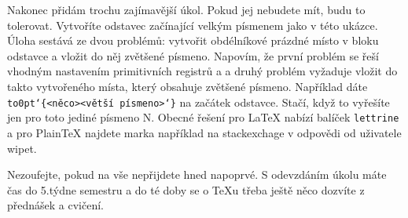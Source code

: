 \Capinsert Nakonec přidám trochu zajímavější úkol. Pokud jej nebudete mít, budu to tolerovat. Vy\-tvoříte odstavec začínající velkým písmenem jako v této ukázce. Úloha sestává ze dvou
problémů: vytvořit obdélníkové prázdné místo v bloku odstavce a vložit do něj zvět\-šené písmeno. Napovím, že první problém se řeší vhodným nastavením primitivních registrů
 a  a druhý problém vyžaduje vložit  do takto vytvořeného místa, který obsahuje zvětšené písmeno. Například dáte
\medskip
{\tt {} to0pt{\tt\char`\{}<něco><větší písmeno>{\tt\char`\}}}
\medskip
\noindent na začátek odstavce. Stačí, když to vyřešíte jen pro toto jediné písmeno N. Obecné řešení pro \LaTeX{}
nabízí balíček {\tt lettrine} a pro Plain\TeX{} najdete marka například na stackexchage v odpovědi od uživatele wipet.

Nezoufejte, pokud na vše nepřijdete hned napoprvé. S odevzdáním úkolu máte čas do
5.\thinspace{}týdne semestru a do té doby se o \TeX{}u třeba ještě něco dozvíte z přednášek a cvičení.


\bye
